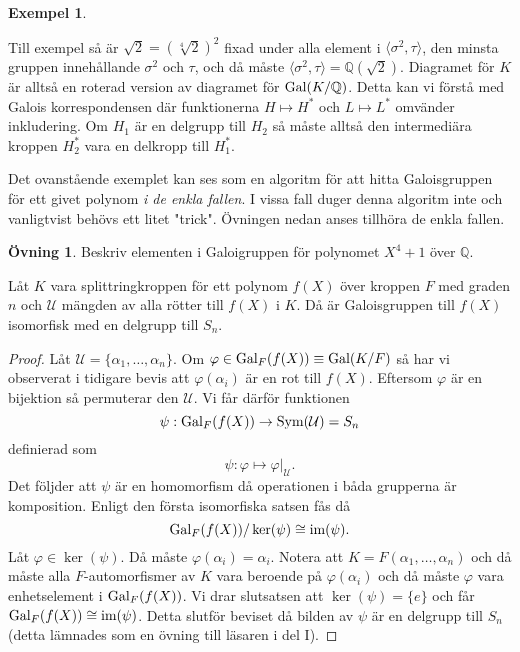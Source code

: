 \documentclass{article}
\newcommand{\im}[0]{\textnormal{im}}
\newcommand{\gal}[0]{\textnormal{Gal}}
\theoremstyle{definition}
\newtheorem{ovning}[thm]{Övning}
\newtheorem{exmp}[thm]{Exempel}
\begin{document}
\begin{exmp}
\begin{center}
  \end{center}  
  Till exempel så är $\sqrt{2} = (\sqrt[4]{2})^2$ fixad under alla element 
  i $\langle \sigma^2, \tau \rangle$, den minsta gruppen innehållande $\sigma^2$ och $\tau$, och då måste 
  $\langle \sigma^2, \tau \rangle = \mathbb{Q}(\sqrt{2})$.
  Diagramet för $K$ är alltså en roterad version av diagramet för $\gal(K/\mathbb{Q})$. Detta kan vi förstå med Galois korrespondensen
  där funktionerna $H \mapsto H^*$ och $L \mapsto L^*$ omvänder inkludering. Om $H_1$ är en delgrupp till $H_2$ så måste alltså den intermediära
  kroppen $H_2^*$ vara en delkropp till $H_1^*$.
\end{exmp}
Det ovanstående exemplet kan ses som en algoritm för att hitta Galoisgruppen för ett givet polynom \textit{i de enkla fallen}.
I vissa fall duger denna algoritm inte och vanligtvist behövs ett litet "trick". Övningen nedan anses tillhöra de enkla fallen.
\begin{ovning}
  Beskriv elementen i Galoigruppen för polynomet $X^4 + 1$ över $\mathbb{Q}$.
\end{ovning}

\hypertarget{lemma9.0.5}{}
\begin{mylemma}{}{}
  Låt $K$ vara splittringkroppen för ett polynom $f(X)$ över kroppen $F$ med graden $n$ och $\mathcal{U}$ mängden av alla rötter till $f(X)$ i $K$. 
  Då är Galoisgruppen till $f(X)$ isomorfisk med en delgrupp till $S_n.$
\end{mylemma}

\begin{proof}
  Låt $\mathcal{U} = \{\alpha_1, \ldots, \alpha_n\}$. Om $\varphi \in \gal_F(f(X)) \equiv \gal(K/F)$ så har vi observerat i tidigare bevis 
  att $\varphi(\alpha_i)$ är en rot till $f(X)$. Eftersom $\varphi$ är en bijektion så permuterar den $\mathcal{U}$. Vi får därför funktionen 
  \[ \psi: \gal_F(f(X)) \rightarrow \textnormal{Sym}(\mathcal{U}) = S_n \]
  definierad som 
  \[\psi: \varphi \mapsto \varphi|_{\mathcal{U}}.\]
  Det följder att $\psi$ är en homomorfism då operationen i båda grupperna är komposition. Enligt den första isomorfiska satsen fås då 
  \[ \gal_F(f(X))/\ker(\psi) \cong \im(\psi). \]
  Låt $\varphi \in \ker(\psi)$. Då måste $\varphi(\alpha_i) = \alpha_i$. Notera att 
  $K = F(\alpha_1, \ldots, \alpha_n)$
  och då måste alla $F$-automorfismer av $K$ vara beroende på 
  $\varphi(\alpha_i)$ och då måste $\varphi$ vara enhetselement i $\gal_F(f(X))$. Vi drar slutsatsen att $\ker(\psi) = \{e\}$ och får 
  $\gal_F(f(X))\cong \im(\psi)$. Detta slutför beviset då bilden av $\psi$ är en delgrupp till $S_n$ (detta lämnades som en övning till läsaren i del I).
\end{proof}
\end{document}
